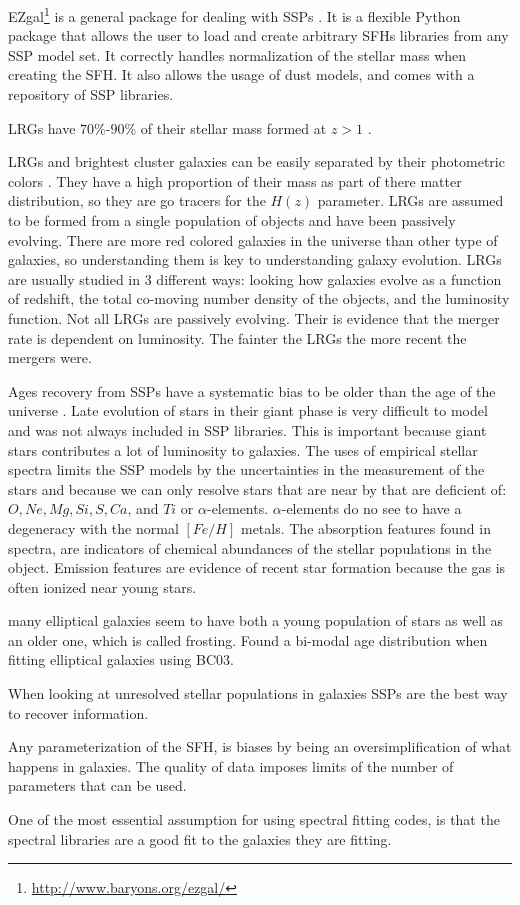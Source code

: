 \documentclass[12pt,oneside,a4paper]{book}
\begin{document}
EZgal\footnote{\url{http://www.baryons.org/ezgal/}} is a general package for dealing with SSPs \citep{Mancone2012}. It is a flexible Python package that allows the user to load and create arbitrary SFHs libraries from any SSP model set. It correctly handles normalization of the stellar mass when creating the SFH. It also allows the usage of dust models, and comes with a repository of SSP libraries.

LRGs have $70\%$-$90\%$ of their stellar mass formed at $z > 1$ \citep{Tojeiro2011}.

LRGs and brightest cluster galaxies can be easily separated by their photometric colors \citep{Tojeiro2010}. They have a high proportion of their mass as part of there matter distribution, so they are go tracers for the $H(z)$ parameter. LRGs are assumed to be formed from a single population of objects and have been passively evolving. There are more red colored galaxies in the universe than other type of galaxies, so understanding them is key to understanding galaxy evolution. LRGs are usually studied in 3 different ways: looking how galaxies evolve as a function of redshift, the total co-moving number density of the objects, and the luminosity function. %
Not all LRGs are passively evolving. Their is evidence that the merger rate is dependent on luminosity. The fainter the LRGs the more recent the mergers were.

Ages recovery from SSPs have a systematic bias to be older than the age of the universe \citep{Tojeiro2009}. Late evolution of stars in their giant phase is very difficult to model and was not always included in SSP libraries. This is important because giant stars contributes a lot of luminosity to galaxies. The uses of empirical stellar spectra limits the SSP models by the uncertainties in the measurement of the stars and because we can only resolve stars that are near by that are deficient of: $O, Ne, Mg, Si, S ,Ca$, and $Ti$ or $\alpha$-elements. $\alpha$-elements do no see to have a degeneracy with the normal $[Fe/H]$ metals. The absorption features found in spectra, are indicators of chemical abundances of the stellar populations in the object. Emission features are evidence of recent star formation because the gas is often ionized near young stars.

\citep{Zhu2010} many elliptical galaxies seem to have both a young population of stars as well as an older one, which is called frosting. Found a bi-modal age distribution when fitting elliptical galaxies using BC03.

\citep{Vazdekis2010} When looking at unresolved stellar populations in galaxies SSPs are the best way to recover information. 



Any parameterization of the SFH, is biases by being an oversimplification of what happens in galaxies. The quality of data imposes limits of the number of parameters that can be used.

One of the most essential assumption for using spectral fitting codes, is that the spectral libraries are a good fit to the galaxies they are fitting.

\end{document}
